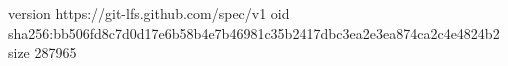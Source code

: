 version https://git-lfs.github.com/spec/v1
oid sha256:bb506fd8c7d0d17e6b58b4e7b46981c35b2417dbc3ea2e3ea874ca2c4e4824b2
size 287965
